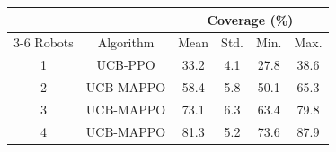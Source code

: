 \begin{tabular}{@{}cccccc@{}}
\toprule
 & & \multicolumn{4}{c}{Coverage (\%)} \\
\cmidrule(l){3-6}
Robots & Algorithm & Mean & Std. & Min. & Max. \\
\midrule
1 & UCB-PPO & 33.2 & 4.1 & 27.8 & 38.6 \\
2 & UCB-MAPPO & 58.4 & 5.8 & 50.1 & 65.3 \\
3 & UCB-MAPPO & 73.1 & 6.3 & 63.4 & 79.8 \\
4 & UCB-MAPPO & 81.3 & 5.2 & 73.6 & 87.9 \\
\bottomrule
\end{tabular}

